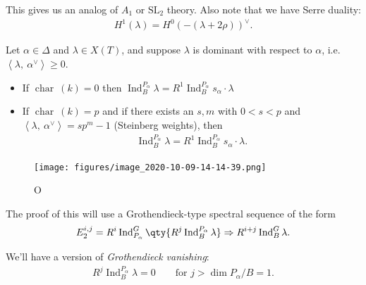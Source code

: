 This gives us an analog of \(A_1\) or \({\text{SL}}_2\) theory. Also
note that we have Serre duality:
\begin{align*}   H^1(\lambda) = H^0( - (\lambda + 2\rho) )^\vee .\end{align*}

\begin{corollary}[?]

\begin{corollary}[?]

Let \(\alpha\in \Delta\) and \(\lambda\in X(T)\), and suppose
\(\lambda\) is dominant with respect to \(\alpha\),
i.e.~\({\left\langle {\lambda},~{\alpha^\vee} \right\rangle} \geq 0\).

\begin{itemize}
\item
  If \(\operatorname{char}~(k) = 0\) then
  \(\operatorname{Ind}_B^{P_\alpha}\lambda = R^1 \operatorname{Ind}_B^{P_\alpha} s_\alpha \cdot \lambda\)
\item
  If \(\operatorname{char}~(k) = p\) and if there exists an \(s, m\)
  with \(0<s<p\) and
  \({\left\langle {\lambda},~{\alpha^\vee} \right\rangle} = sp^m - 1\)
  (Steinberg weights), then
  \begin{align*}       \operatorname{Ind}_B^{P_\alpha} \lambda = R^1 \operatorname{Ind}_B^{P_\alpha} s_\alpha \cdot \lambda     .\end{align*}
\end{itemize}

\begin{figure}
\centering
\texttt{[image: figures/image\_2020-10-09-14-14-39.png]}
\caption{O}
\end{figure}

\end{corollary}

\end{corollary}

The proof of this will use a Grothendieck-type spectral sequence of the
form
\begin{align*}   E_2^{i, j} = R^i \operatorname{Ind}_{P_\alpha}^G \qty{ R^j \operatorname{Ind}_B^{P_\alpha} \lambda} \Rightarrow R^{i+j} \operatorname{Ind}_B^G \lambda .\end{align*}

We'll have a version of \emph{Grothendieck vanishing}:
\begin{align*}   R^j \operatorname{Ind}_B^{P_\alpha} \lambda = 0 \qquad\text{for } j > \dim P_\alpha/B = 1 .\end{align*}

